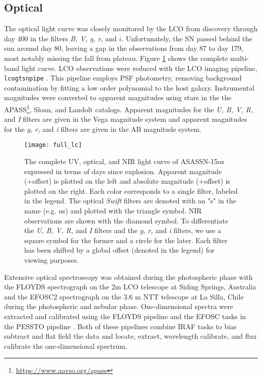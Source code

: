 \documentclass[a4paper,fleqn,usenatbib]{mnras}
\begin{document}
\subsection{Optical \label{subsec:optical}}
The optical light curve was closely monitored by the LCO from discovery through day 400 in the filters {\it B, V, g, r,} and $i$. 
Unfortunately, the SN passed behind the sun around day 80, leaving a gap in the observations from day 87 to day 179, most notably missing the fall from plateau.
Figure \ref{fig:LC} shows the complete multi-band light curve.
LCO observations were reduced with the LCO imaging pipeline, {\tt lcogtsnpipe} \citep{2016valenti}. 
This pipeline employs PSF photometry, removing background contamination by fitting a low order polynomial to the host galaxy.
Instrumental magnitudes were converted to apparent magnitudes using stars in the the APASS\footnote{\hyperlink{https://www.aavso.org/apass}{https://www.aavso.org/apass}}, Sloan, and Landolt catalogs.
Apparent magnitudes for the {\it U, B, V, R,} and {\it I} filters are given in the Vega magnitude system and apparent magnitudes for  the {\it g, r,} and {\it i} filters are given in the AB magnitude system.
\begin{figure}
\begin{center}
\texttt{[image: full\_lc]}
\caption{The complete UV, optical, and NIR light curve of ASASSN-15oz expressed in terms of days since explosion.
Apparent magnitude (+offset) is plotted on the left and absolute magnitude (+offset) is plotted on the right. 
Each color corresponds to a single filter, labeled in the legend. 
The optical {\it Swift} filters are denoted with an "s" in the name (e.g. us) and plotted with the triangle symbol.
NIR observations are shown with the diamond symbol.
To differentiate the {\it U, B, V, R,} and {\it I} filters and the {\it g, r,} and {\it i} filters, we use a square symbol for the former and a circle for the later.
Each filter has been shifted by a global offset (denoted in the legend) for viewing purposes.}
\label{fig:LC}
\end{center}
\end{figure}

Extensive optical spectroscopy was obtained during the photospheric phase with the FLOYDS spectrograph \citep{2013brown} on the 2m LCO telescope at Siding Springs, Australia and the EFOSC2 spectrograph \citep{1984buzzoni} on the 3.6 m NTT telescope at La Silla, Chile during the photospheric and nebular phase. 
One-dimensional spectra were extracted and calibrated using the FLOYDS pipeline \citep{2014valenti} and the EFOSC tasks in the PESSTO pipeline \citep{2015smartt}. 
Both of these pipelines combine IRAF tasks to bias subtract and flat field the data and locate, extract, wavelength calibrate, and flux calibrate the one-dimensional spectrum.
\end{document}
